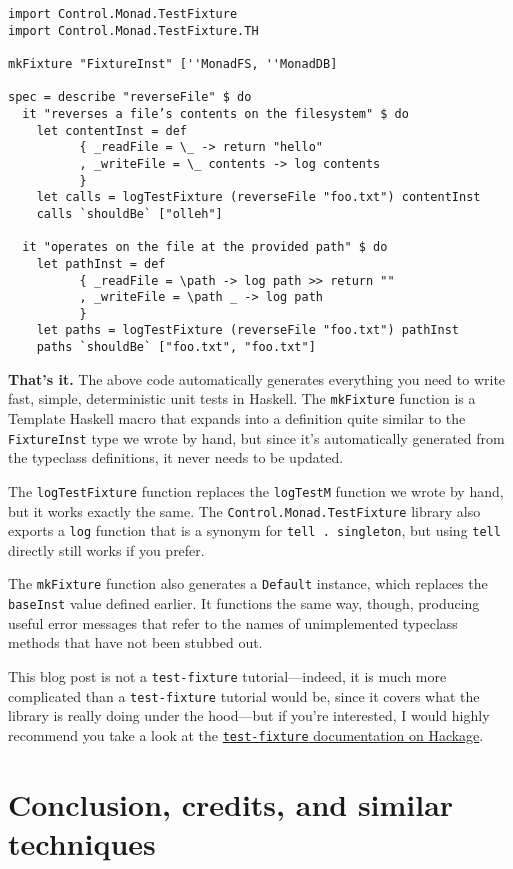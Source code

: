 \begin{verbatim}
import Control.Monad.TestFixture
import Control.Monad.TestFixture.TH

mkFixture "FixtureInst" [''MonadFS, ''MonadDB]

spec = describe "reverseFile" $ do
  it "reverses a file’s contents on the filesystem" $ do
    let contentInst = def
          { _readFile = \_ -> return "hello"
          , _writeFile = \_ contents -> log contents
          }
    let calls = logTestFixture (reverseFile "foo.txt") contentInst
    calls `shouldBe` ["olleh"]

  it "operates on the file at the provided path" $ do
    let pathInst = def
          { _readFile = \path -> log path >> return ""
          , _writeFile = \path _ -> log path
          }
    let paths = logTestFixture (reverseFile "foo.txt") pathInst
    paths `shouldBe` ["foo.txt", "foo.txt"]
\end{verbatim}
\textbf{That's it.} The above code automatically generates everything
you need to write fast, simple, deterministic unit tests in Haskell. The
\texttt{mkFixture} function is a Template Haskell macro that expands
into a definition quite similar to the \texttt{FixtureInst} type we
wrote by hand, but since it's automatically generated from the typeclass
definitions, it never needs to be updated.

The \texttt{logTestFixture} function replaces the \texttt{logTestM}
function we wrote by hand, but it works exactly the same. The
\texttt{Control.Monad.TestFixture} library also exports a \texttt{log}
function that is a synonym for \texttt{tell\ .\ singleton}, but using
\texttt{tell} directly still works if you prefer.

The \texttt{mkFixture} function also generates a \texttt{Default}
instance, which replaces the \texttt{baseInst} value defined earlier. It
functions the same way, though, producing useful error messages that
refer to the names of unimplemented typeclass methods that have not been
stubbed out.

This blog post is not a \texttt{test-fixture} tutorial---indeed, it is
much more complicated than a \texttt{test-fixture} tutorial would be,
since it covers what the library is really doing under the hood---but if
you're interested, I would highly recommend you take a look at the
\href{http://hackage.haskell.org/package/test-fixture}{\texttt{test-fixture}
documentation on Hackage}.

\section{Conclusion, credits, and similar
techniques}\label{conclusion-credits-and-similar-techniques}

